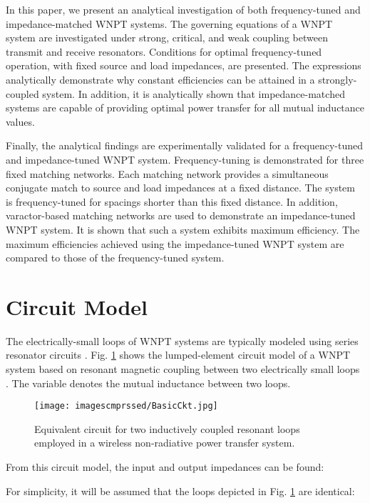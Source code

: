 \documentclass[journal]{IEEEtran}
\begin{document}
In this paper, we present an analytical investigation of both frequency-tuned and impedance-matched WNPT systems. The governing equations of a WNPT system are investigated under strong, critical, and weak coupling between transmit and receive resonators. Conditions for optimal frequency-tuned operation, with fixed source and load impedances, are presented. The expressions analytically demonstrate why constant efficiencies can be attained in a strongly-coupled system. In addition, it is analytically shown that impedance-matched systems are capable of providing optimal power transfer for all mutual inductance values.

Finally, the analytical findings are experimentally validated for a frequency-tuned and impedance-tuned WNPT system. Frequency-tuning is demonstrated for three fixed matching networks. Each matching network provides a simultaneous conjugate match to source and load impedances at a fixed distance. The system is frequency-tuned for spacings shorter than this fixed distance. In addition, varactor-based matching networks are used to demonstrate an impedance-tuned WNPT system. It is shown that such a system exhibits maximum efficiency. The maximum efficiencies achieved using the impedance-tuned WNPT system  are compared to those of the frequency-tuned system.

\section{Circuit Model}
\label{sec:CircuitModel}

The electrically-small loops of WNPT systems are typically modeled using series resonator circuits \cite{FundamentalWNPT}. Fig. \ref{fig:BasicCkt} shows the lumped-element circuit model of a WNPT system based on resonant magnetic coupling between two electrically small loops \cite{Thomas, Thomas2}. The variable  denotes the mutual inductance between two loops.
\begin{figure}[htbp]
    \centering
    \texttt{[image: imagescmprssed/BasicCkt.jpg]}
    \caption{Equivalent circuit for two  inductively coupled resonant loops employed in a wireless non-radiative power transfer system.}
    \label{fig:BasicCkt}
\end{figure}

From this circuit model, the input and output impedances can be found:

For simplicity, it will be assumed that the loops depicted in Fig. \ref{fig:BasicCkt} are identical:
\end{document}
